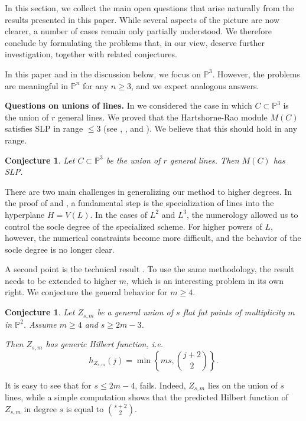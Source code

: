 \documentclass[12pt]{amsart}%
\numberwithin{equation}{section}
\newtheorem{conjecture}[theorem]{Conjecture}
\theoremstyle{definition}
\numberwithin{equation}{section}
\newcounter{step}
\newcommand{\PP}{ \ensuremath{\mathbb{P}}}
\begin{document}
{In this section, we collect the main open questions that arise naturally from the results presented in this paper. While several aspects of the picture are now clearer, a number of cases remain only partially understood. We therefore conclude by formulating the problems that, in our view, deserve further investigation, together with related conjectures.\hfill\break 

In this paper and in the discussion below, we focus on $\PP^3$. However, the problems are meaningful in $\PP^n$ for any $n \ge 3$, and we expect analogous answers. 


\textbf{Questions on  unions of lines.} In  we considered the case in which $C\subset \PP^3$ is the union of $r$ general lines. We proved that the Hartshorne-Rao module $M(C)$ satisfies SLP in range $\leq 3$ (see , , and ).  We believe that this should hold in any range.

\begin{conjecture}\label{conj:gen lines}
    Let $C\subset\PP^3$ be the union of $r$ general lines. Then $M(C)$ has SLP.
\end{conjecture}

There are two main challenges in generalizing our method to higher degrees. In the proof of  and , a fundamental step is the specialization of lines into the hyperplane $H=V(L)$. In the cases of $L^2$ and $L^3$, the numerology allowed us to control the socle degree of the specialized scheme. For higher powers of $L$, however, the numerical constraints become more difficult, and the behavior of the socle degree is no longer clear.

A second point is the technical result . To use the same methodology, the result needs to be extended to higher $m$, which is an interesting problem in its own right. We conjecture the general behavior for $m\geq 4$.


\begin{conjecture}\label{conj:mflatfat}
    Let $Z_{s,m}$ be a general union of $s$ flat fat points of multiplicity $m$ in $\mathbb P^2$. Assume $m \geq 4$ and $s \geq 2m-3$. 
    
    Then $Z_{s,m}$ has generic Hilbert function, i.e.
    \[    h_{Z_{s,m}}(j) = \min \left \{ ms, \binom{j+2}{2} \right \}.
    \]
\end{conjecture}

It is easy to see that for $s\leq 2m-4$,  fails. Indeed, $Z_{s,m}$ lies on the union of $s$ lines, while a simple computation shows that the predicted Hilbert function of ${Z_{s,m}}$ in degree $s$ is equal to $\binom{s+2}{2}$.

}
\end{document}
